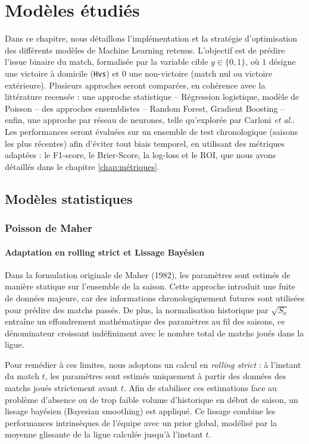 \chapter{Modèles étudiés}
\label{chap:modeles}

Dans ce chapitre, nous détaillons l'implémentation et la stratégie d'optimisation des différents 
modèles de Machine Learning retenus. L'objectif est de prédire l'issue binaire du match, formalisée 
par la variable cible $y \in \{0, 1\}$, où $1$ désigne une victoire à domicile (\texttt{Hvs}) et 
$0$ une non-victoire (match nul ou victoire extérieure). Plusieurs approches seront comparées, en 
cohérence avec la littérature recensée : une approche statistique -- Régression logistique, modèle de 
Poisson -- des approches ensemblistes -- Random Forest, Gradient Boosting -- enfin, une approche 
par réseau de neurones, telle qu'explorée par Carloni \textit{et al.}\cite{carloni}.\\
Les performances seront évaluées sur un ensemble de test chronologique (saisons les plus récentes) 
afin d'éviter tout biais temporel, en utilisant des métriques adaptées : le F1-score, le Brier-Score, 
la log-loss et le ROI, que nous avons détaillés dans le chapitre \ref{chap:métriques}.


\section{Modèles statistiques}
\label{sec:stat_poisson}
\subsection{Poisson de Maher}
\subsubsection{Adaptation en rolling strict et Lissage Bayésien}

Dans la formulation originale de Maher (1982), les paramètres sont estimés de 
manière statique sur l'ensemble de la saison. Cette approche introduit une 
fuite de données majeure, car des informations chronologiquement futures sont 
utilisées pour prédire des matchs passés. De plus, la normalisation historique par 
$\sqrt{S_x}$ entraîne un effondrement mathématique des paramètres au fil des saisons, ce 
dénominateur croissant indéfiniment avec le nombre total de matchs joués dans la ligue.

Pour remédier à ces limites, nous adoptons un calcul en \textit{rolling strict} : à 
l'instant du match $t$, les paramètres sont estimés uniquement à partir des données 
des matchs joués strictement avant $t$. Afin de stabiliser ces estimations 
face au problème d'absence ou de trop faible volume d'historique en début de saison, 
un lissage bayésien (Bayesian smoothing) est appliqué. 
Ce lissage combine les performances intrinsèques de l'équipe avec un prior 
global, modélisé par la moyenne glissante de la ligue calculée jusqu'à l'instant $t$. 

